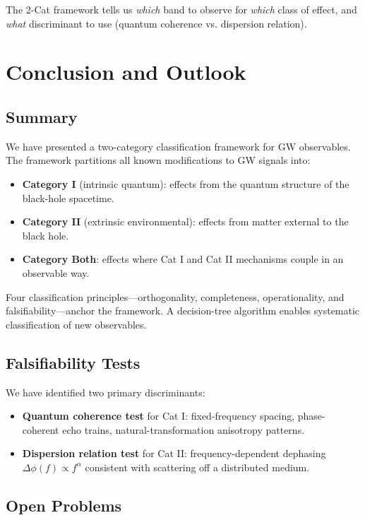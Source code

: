\documentclass[11pt]{article}
\begin{document}
The 2-Cat framework tells us \emph{which} band to observe for \emph{which} class of effect, and \emph{what} discriminant to use (quantum coherence vs. dispersion relation).

\section{Conclusion and Outlook}\label{sec:conclusion}

\subsection{Summary}

We have presented a two-category classification framework for GW observables. The framework partitions all known modifications to GW signals into:
\begin{itemize}
\item \textbf{Category I} (intrinsic quantum): effects from the quantum structure of the black-hole spacetime.
\item \textbf{Category II} (extrinsic environmental): effects from matter external to the black hole.
\item \textbf{Category Both}: effects where Cat I and Cat II mechanisms couple in an observable way.
\end{itemize}
Four classification principles---orthogonality, completeness, operationality, and falsifiability---anchor the framework. A decision-tree algorithm enables systematic classification of new observables.

\subsection{Falsifiability Tests}

We have identified two primary discriminants:
\begin{itemize}
\item \textbf{Quantum coherence test} for Cat I: fixed-frequency spacing, phase-coherent echo trains, natural-transformation anisotropy patterns.
\item \textbf{Dispersion relation test} for Cat II: frequency-dependent dephasing $\Delta\phi(f) \propto f^\alpha$ consistent with scattering off a distributed medium.
\end{itemize}

\subsection{Open Problems}
\end{document}
